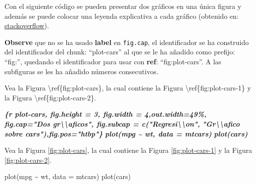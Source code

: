 \documentclass[12pt,a4paper,oneside,]{article}
\newenvironment{Shaded}{\begin{snugshade}}{\end{snugshade}}
\newcommand{\AttributeTok}[1]{\textcolor[rgb]{0.77,0.63,0.00}{#1}}
\newcommand{\FunctionTok}[1]{\textcolor[rgb]{0.00,0.00,0.00}{#1}}
\newcommand{\InformationTok}[1]{\textcolor[rgb]{0.56,0.35,0.01}{\textbf{\textit{#1}}}}
\newcommand{\NormalTok}[1]{#1}
\newcommand{\SpecialCharTok}[1]{\textcolor[rgb]{0.00,0.00,0.00}{#1}}
\numberwithin{dummy}{section}
\theoremstyle{ocrenumbox}
\theoremstyle{blacknumex}
\theoremstyle{blacknumbox}
\theoremstyle{ocrenum}
\theoremstyle{ocrenum}
\begin{document}
Con el siguiente código se pueden presentar dos gráficos en una única
figura y además se puede colocar una leyenda explicativa a cada gráfico
(obtenido en:
\href{https://stackoverflow.com/questions/53850299/how-to-get-a-newline-in-a-figure-caption-in-rmarkdown-bookdown-pdfdocument2}{stackoverflow}).

\textbf{Observe} que no se ha usado \textbf{label} en \texttt{fig.cap},
el identificador se ha construido del identificador del chunk:
``plot-cars'' al que se le ha añadido como prefijo: ``fig:'', quedando
el identificador para usar con \textbf{ref}: ``fig:plot-cars''. A las
subfiguras se les ha añadido números consecutivos.

\begin{Shaded}
\begin{Highlighting}[]

\NormalTok{Vea la Figura \textbackslash{}ref\{fig:plot{-}cars\}, la cual contiene la Figura }
\NormalTok{\textbackslash{}ref\{fig:plot{-}cars{-}1\} y la Figura \textbackslash{}ref\{fig:plot{-}cars{-}2\}.}

\InformationTok{\textasciigrave{}\textasciigrave{}\textasciigrave{}\{r plot{-}cars, fig.height = 3, fig.width = 4,out.width=\textquotesingle{}49\%\textquotesingle{}, }
\InformationTok{fig.cap="Dos gr\textbackslash{}\textbackslash{}\textquotesingle{}aficos", fig.subcap = c("Regresi\textbackslash{}\textbackslash{}\textquotesingle{}on", }
\InformationTok{"Gr\textbackslash{}\textbackslash{}\textquotesingle{}afico sobre cars"),fig.pos="htbp"\}}
\InformationTok{plot(mpg \textasciitilde{} wt, data = mtcars)}
\InformationTok{plot(cars)}
\InformationTok{\textasciigrave{}\textasciigrave{}\textasciigrave{}}
\end{Highlighting}
\end{Shaded}

Vea la Figura \ref{fig:plot-cars}, la cual contiene la Figura
\ref{fig:plot-cars-1} y la Figura \ref{fig:plot-cars-2}.

\begin{Shaded}
\begin{Highlighting}[]
\FunctionTok{plot}\NormalTok{(mpg }\SpecialCharTok{\textasciitilde{}}\NormalTok{ wt, }\AttributeTok{data =}\NormalTok{ mtcars)}
\FunctionTok{plot}\NormalTok{(cars)}
\end{Highlighting}
\end{Shaded}
\end{document}
